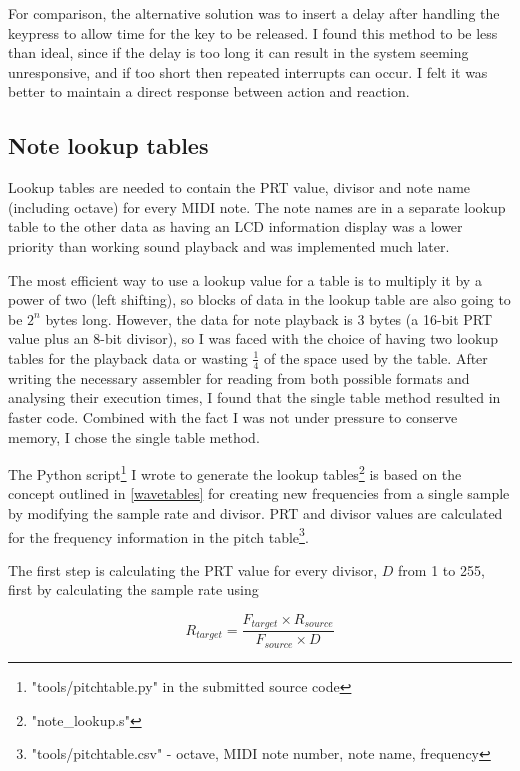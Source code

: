 For comparison, the alternative solution was to insert a delay after handling the keypress to allow 
time for the key to be released.  I found this method to be less than ideal, since if the delay is 
too long it can result in the system seeming unresponsive, and if too short then repeated interrupts 
can occur.  I felt it was better to maintain a direct response between action and reaction.

\subsection{Note lookup tables}
\label{notelookuptables}

Lookup tables are needed to contain the PRT value, divisor and note name (including octave) for 
every MIDI note.  The note names are in a separate lookup table to the other data as having an LCD 
information display was a lower priority than working sound playback and was implemented much later.

The most efficient way to use a lookup value for a table is to multiply it by a power of two (left 
shifting), so blocks of data in the lookup table are also going to be $2^n$ bytes long.  However, 
the data for note playback is 3 bytes (a 16-bit PRT value plus an 8-bit divisor), so I was faced 
with the choice of having two lookup tables for the playback data or wasting $\frac{1}{4}$ of the 
space used by the table.  After writing the necessary assembler for reading from both possible 
formats and analysing their execution times, I found that the single table method resulted in faster 
code.  Combined with the fact I was not under pressure to conserve memory, I chose the single table 
method.

The Python script\footnote{"tools/pitchtable.py" in the submitted source code} I wrote to generate 
the lookup tables\footnote{"note\_lookup.s"} is based on the concept outlined in \ref{wavetables} 
for creating new frequencies from a single sample by modifying the sample rate and divisor.  PRT and 
divisor values are calculated for the frequency information in the pitch 
table\footnote{"tools/pitchtable.csv" - octave, MIDI note number, note name, frequency}.

The first step is calculating the PRT value for every divisor, $D$ from 1 to 255, first by 
calculating the sample rate using

\[R_{target} = \frac{F_{target} \times R_{source}}{F_{source} \times D}\]

